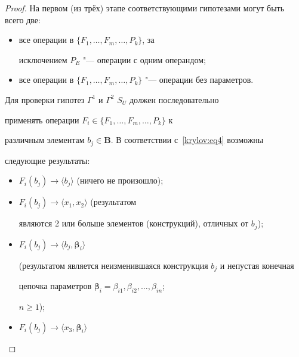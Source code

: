 \begin{proof}

На первом (из трёх) этапе соответствующими гипотезами могут быть всего две:

\begin{itemize}

\item[$\Gamma^{1}$)] все операции в $\{F_{1},\ldots, F_{m},\ldots, P_{k}\}$, за

исключением $P_{E}$ "--- операции с одним операндом;



\item[$\Gamma^{2}$)] все операции в $\{F_{1},\ldots, F_{m},\ldots, P_{k}\}$ "--- операции без параметров.



\end{itemize}



Для проверки гипотез $\Gamma ^{1}$ и $\Gamma ^{2}$ $S_{U}$ должен последовательно

применять операции $F_{i}\in \{F_{1},\ldots, F_{m},\ldots, P_{k}\}$ к

различным элементам $b_{j}\in \mathbf{B}$. В соответствии с~\eqref{krylov:eq4} возможны

следующие результаты:

\begin{itemize}



\item[a)] \hypertarget{kr:a}{} $F_{i}(b_{j}) \to \langle b_{j} \rangle$ (ничего не произошло);



\item[b)] \hypertarget{kr:b}{} $F_{i}(b_{j})\to \langle x_{1}, x_{2}\rangle$ (результатом

являются 2 или больше элементов (конструкций), отличных от $b_{j}$);



\item[c)] \hypertarget{kr:c}{} $F_{i}(b_{j})\to \langle b_{j}, \boldsymbol{\beta}_{i} \rangle$

(результатом является неизменившаяся конструкция $b_{j}$ и непустая конечная

цепочка параметров $\boldsymbol{\beta}_{i} =\beta_{i1}, \beta_{i2},\ldots, \beta_{in}$;

$n\ge 1$);



\item[d)] \hypertarget{kr:d}{} $F_{i}(b_{j})\to \langle x_{3}, \boldsymbol{\beta}_{i}\rangle$


\end{itemize}
\end{proof}
